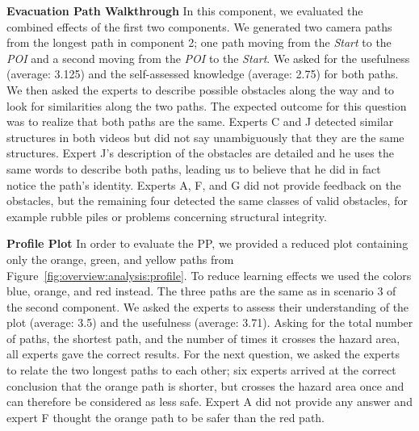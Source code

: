 \documentclass[review,journal]{vgtc}         %
\begin{document}
\noindent \textbf{Evacuation Path Walkthrough} In this component, we evaluated the combined effects of the first two components. We generated two camera paths from the longest path in component 2; one path moving from the \emph{Start} to the \emph{POI} and a second moving from the \emph{POI} to the \emph{Start}. We asked for the usefulness (average: 3.125) and the self-assessed knowledge (average: 2.75) for both paths. We then asked the experts to describe possible obstacles along the way and to look for similarities along the two paths. The expected outcome for this question was to realize that both paths are the same. Experts C and J detected similar structures in both videos but did not say unambiguously that they are the same structures. Expert J's description of the obstacles are detailed and he uses the same words to describe both paths, leading us to believe that he did in fact notice the path's identity. Experts A, F, and G did not provide feedback on the obstacles, but the remaining four detected the same classes of valid obstacles, for example rubble piles or problems concerning structural integrity. %

\noindent \textbf{Profile Plot} In order to evaluate the PP, we provided a reduced plot containing only the orange, green, and yellow paths from Figure~\ref{fig:overview:analysis:profile}. To reduce learning effects we used the colors blue, orange, and red instead. The three paths are the same as in scenario 3 of the second component. We asked the experts to assess their understanding of the plot (average: 3.5) and the usefulness (average: 3.71). Asking for the total number of paths, the shortest path, and the number of times it crosses the hazard area, all experts gave the correct results. For the next question, we asked the experts to relate the two longest paths to each other; six experts arrived at the correct conclusion that the orange path is shorter, but crosses the hazard area once and can therefore be considered as less safe. Expert A did not provide any answer and expert F thought the orange path to be safer than the red path.
\end{document}
